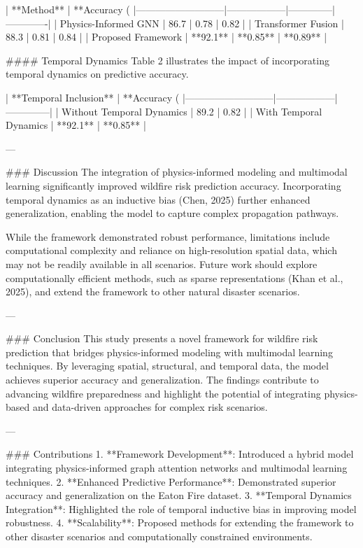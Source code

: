 | **Method**                | **Accuracy (%
|---------------------------|------------------|--------------|-------------|  
| Physics-Informed GNN      | 86.7             | 0.78         | 0.82        |  
| Transformer Fusion        | 88.3             | 0.81         | 0.84        |  
| Proposed Framework        | **92.1**         | **0.85**     | **0.89**    |  

#### Temporal Dynamics  
Table 2 illustrates the impact of incorporating temporal dynamics on predictive accuracy.  

| **Temporal Inclusion**    | **Accuracy (%
|---------------------------|------------------|--------------|  
| Without Temporal Dynamics | 89.2             | 0.82         |  
| With Temporal Dynamics    | **92.1**         | **0.85**     |  

---

### Discussion  
The integration of physics-informed modeling and multimodal learning significantly improved wildfire risk prediction accuracy. Incorporating temporal dynamics as an inductive bias (Chen, 2025) further enhanced generalization, enabling the model to capture complex propagation pathways.  

While the framework demonstrated robust performance, limitations include computational complexity and reliance on high-resolution spatial data, which may not be readily available in all scenarios. Future work should explore computationally efficient methods, such as sparse representations (Khan et al., 2025), and extend the framework to other natural disaster scenarios.  

---

### Conclusion  
This study presents a novel framework for wildfire risk prediction that bridges physics-informed modeling with multimodal learning techniques. By leveraging spatial, structural, and temporal data, the model achieves superior accuracy and generalization. The findings contribute to advancing wildfire preparedness and highlight the potential of integrating physics-based and data-driven approaches for complex risk scenarios.  

---

### Contributions  
1. **Framework Development**: Introduced a hybrid model integrating physics-informed graph attention networks and multimodal learning techniques.  
2. **Enhanced Predictive Performance**: Demonstrated superior accuracy and generalization on the Eaton Fire dataset.  
3. **Temporal Dynamics Integration**: Highlighted the role of temporal inductive bias in improving model robustness.  
4. **Scalability**: Proposed methods for extending the framework to other disaster scenarios and computationally constrained environments.  

